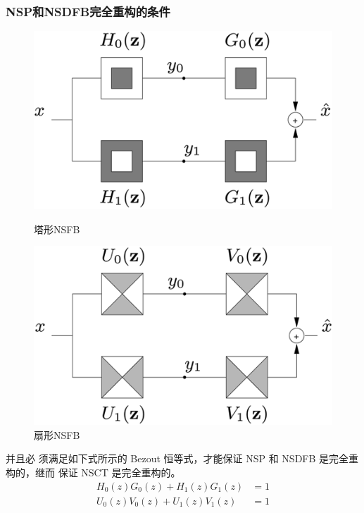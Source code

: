 \documentclass[10pt,aspectratio=43,mathserif]{beamer}
\begin{document}
\begin{frame}
		  \frametitle{\textbf{NSP和NSDFB完全重构的条件}}
            \begin{figure}[ht] %
	\begin{minipage}[t]{0.5\linewidth}%
		\centering
		\includegraphics[width=0.8\linewidth]{./figures/nsct/NSFB_struct(a).png}
		\setlength{\abovecaptionskip}{5pt}
		\setlength{\belowcaptionskip}{5pt}
		\caption{塔形NSFB}
		\label{fig:NSFB_struct(a)}
	\end{minipage}%
	\begin{minipage}[t]{0.5\linewidth}
		\centering
		\includegraphics[width=0.8\linewidth]{./figures/nsct/NSFB_struct(b).png}
		\setlength{\abovecaptionskip}{5pt}
		\setlength{\belowcaptionskip}{5pt}
		\caption{扇形NSFB}
		\label{fig:NSFB_struct(b)}
	\end{minipage}
\end{figure}
并且必
须满足如下式所示的 Bezout 恒等式，才能保证 NSP 和 NSDFB 是完全重构的，继而
保证 NSCT 是完全重构的。
            \begin{equation*}
                \begin{aligned}
                H_0(z)G_0(z)+H_1(z)G_1(z) &= 1\\
                U_0(z)V_0(z)+U_1(z)V_1(z) &= 1
                \end{aligned}
            \end{equation*}
		\end{frame}
\end{document}
